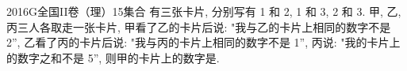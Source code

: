
\begin{problem}{2016}{G}{全国II卷（理）}{15}{集合}
有三张卡片, 分别写有 1 和 2, 1 和 3, 2 和 3. 甲, 乙, 丙三人各取走一张卡片, 甲看了乙的卡片后说: "我与乙的卡片上相同的数字不是 2'', 乙看了丙的卡片后说: "我与丙的卡片上相同的数字不是 1'', 丙说: "我的卡片上的数字之和不是 5'', 则甲的卡片上的数字是\underline{\hspace{4em}}.
\end{problem}